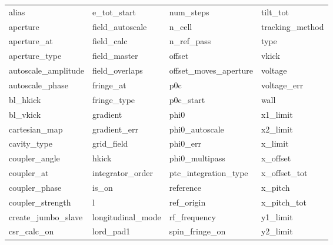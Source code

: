  \begin{tabular}{llll} \toprule
alias                       & e_tot_start                 & num_steps                   & tilt_tot                    \\
aperture                    & field_autoscale             & n_cell                      & tracking_method             \\
aperture_at                 & field_calc                  & n_ref_pass                  & type                        \\
aperture_type               & field_master                & offset                      & vkick                       \\
autoscale_amplitude         & field_overlaps              & offset_moves_aperture       & voltage                     \\
autoscale_phase             & fringe_at                   & p0c                         & voltage_err                 \\
bl_hkick                    & fringe_type                 & p0c_start                   & wall                        \\
bl_vkick                    & gradient                    & phi0                        & x1_limit                    \\
cartesian_map               & gradient_err                & phi0_autoscale              & x2_limit                    \\
cavity_type                 & grid_field                  & phi0_err                    & x_limit                     \\
coupler_angle               & hkick                       & phi0_multipass              & x_offset                    \\
coupler_at                  & integrator_order            & ptc_integration_type        & x_offset_tot                \\
coupler_phase               & is_on                       & reference                   & x_pitch                     \\
coupler_strength            & l                           & ref_origin                  & x_pitch_tot                 \\
create_jumbo_slave          & longitudinal_mode           & rf_frequency                & y1_limit                    \\
csr_calc_on                 & lord_pad1                   & spin_fringe_on              & y2_limit                    \\

\end{tabular}
